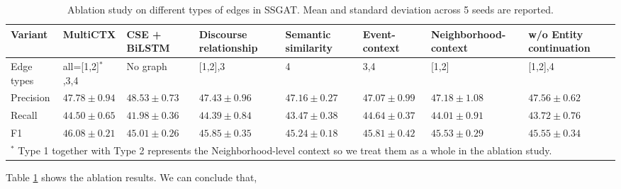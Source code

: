 \begin{table}[htbp]
  \centering 
    \begin{tabular}{p{4em}p{6em}p{6em}p{6em}p{6em}p{6em}p{6em}p{6em}}
    \toprule
         \textbf{Variant} & \textbf{MultiCTX} & \textbf{CSE + BiLSTM} & \textbf{Discourse relationship } & \textbf{Semantic similarity} & \textbf{Event-context} & \textbf{Neighborhood-context}  &  \textbf{w/o Entity continuation} \\\midrule
       Edge types &  all=[1,2]$^{*}$,3,4  & No graph & [1,2],3 & 4  & 3,4 &  [1,2] & [1,2],4\\\hline
    Precision &    $47.78 \pm 0.94$   &  $48.53 \pm 0.73$ &  $47.43 \pm 0.96$ &    $47.16 \pm 0.27$   &  $47.07\pm 0.99$ &  $47.18 \pm 1.08$     &  $47.56 \pm 0.62$       \\
    \hline
    Recall &   $44.50 \pm 0.65$    &   $41.98\pm 0.36$  & $44.39\pm 0.84$  &    $43.47\pm 0.38$ & $44.64\pm 0.37$  & $44.01\pm 0.91$  &      $43.72\pm 0.76$   \\
    \hline
    F1    &  $46.08\pm0.21$  & $45.01 \pm 0.26 $  &   $45.85\pm0.35$    &  $45.24\pm0.18$        & $45.81\pm0.42 $     & $45.53\pm0.29$   &  $45.55\pm0.34$\\
    \bottomrule
    \multicolumn{8}{l}{$^{*}$  Type 1 together with Type 2 represents the Neighborhood-level context so we treat them as a whole in the ablation study.} \\
    \end{tabular}%
      \caption{Ablation study on different types of edges in SSGAT. Mean and standard deviation across 5 seeds are reported.}
  \label{tab:ablation}%
\end{table}%


  
Table \ref{tab:ablation} shows the ablation results. We can conclude that, 

